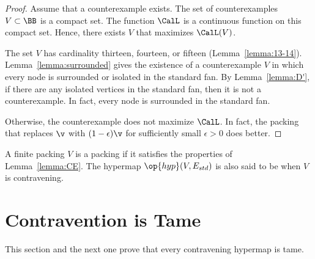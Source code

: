 \begin{proof} Assume that a counterexample exists.  The set of
  counterexamples $V\subset\BB$ is a compact set.  The function
  $\CalL$ is a continuous function on this compact set.  Hence, there
  exists $V$ that maximizes $\CalL(V)$.

  The set $V$ has cardinality thirteen, fourteen,  or fifteen
  (Lemma~\ref{lemma:13-14}). Lemma~\ref{lemma:surrounded} gives the
  existence of a counterexample $V$ in which every node is
  surrounded or isolated in the standard fan.  By
  Lemma~\ref{lemma:D'}, if there are any isolated vertices in the
  standard fan, then it is not a counterexample.  In fact, every
  node is surrounded in the standard fan.

    Otherwise, the counterexample does not
  maximize $\CalL$.  In fact, the packing that replaces $\v$ with $(1-\epsilon)\v$ for sufficiently small $\epsilon>0$ does better.
\end{proof}


\begin{definition}[contravening]
  A finite packing  $V$ is a  packing if it
  satisfies the properties of Lemma~\ref{lemma:CE}.  The
 hypermap $\op{hyp}(V,E_{std})$ is also said to be
   when $V$ is contravening.
\end{definition}






\section{Contravention is Tame}
%
\label{sec:contraproof}

This section and the next one prove that every contravening hypermap is tame.

